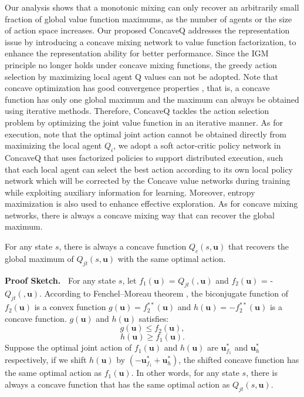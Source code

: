{Our analysis shows that a monotonic mixing can only recover an arbitrarily small fraction of global value function maximums, as the number of agents or the size of action space increases. 
Our proposed ConcaveQ addresses the representation issue by introducing a concave mixing network to value function factorization, to enhance the representation ability for better performance. Since the IGM principle no longer holds under concave mixing functions, the greedy action selection by maximizing local agent Q values can not be adopted.
Note that concave optimization has good convergence properties \cite{concaveopt}, that is, a concave function has only one global maximum and the maximum can always be obtained using iterative methods. Therefore,  ConcaveQ tackles the action selection problem by optimizing the joint value function in an iterative manner. As for execution, note that the optimal joint action cannot be obtained directly from maximizing the local agent $Q_i$, we adopt a soft actor-critic policy network in ConcaveQ that uses factorized policies to support distributed execution, such that each local agent can select the best action according to its own local policy network which will be corrected by the Concave value networks during training while exploiting auxiliary information for learning. Moreover, entropy maximization is also used to enhance effective exploration.  As for concave mixing networks, there is always a concave mixing way that can recover the global maximum. 
 
{\begin{prop}
For any state $s$, there is always a concave function $Q_{c}(s, \textbf{u})$ that recovers the global maximum of  $Q_{jt}(s, \textbf{u})$ with the same optimal action.
\end{prop}  

\noindent\textbf{Proof  Sketch.\ } 
For any state $s$, let $f_1(\textbf{u})$ = $Q_{jt}(, \textbf{u})$ and $f_2(\textbf{u})$ = -$Q_{jt}(, \textbf{u})$. According to Fenchel–Moreau theorem \cite{convex_conjugate}, the biconjugate function of $f_2(\textbf{u})$ is a convex function $g(\textbf{u}) = f_2^{**}(\textbf{u})$ and $h(\textbf{u}) = -f_2^{**}(\textbf{u})$  is a concave function. $g(\textbf{u})$ and $h(\textbf{u})$ satisfies:
 \begin{equation}
    g(\textbf{u}) \leq f_2(\textbf{u}), 
\end{equation}
 \begin{equation}
    h(\textbf{u}) \geq f_1(\textbf{u}).
\end{equation}
Suppose the optimal joint action of $f_1(\textbf{u})$ and $h(\textbf{u})$ are $\textbf{u}_{f_1}^*$ and $\textbf{u}_h^*$ respectively,  if we shift $h(\textbf{u})$ by $(-\textbf{u}_{f_1}^* + \textbf{u}_h^*)$, the shifted concave function has the same optimal action as $f_1(\textbf{u})$. In other words, for any state $s$, there is always a concave function that has the same optimal action as $Q_{jt}(s, \textbf{u})$. 
}

}
